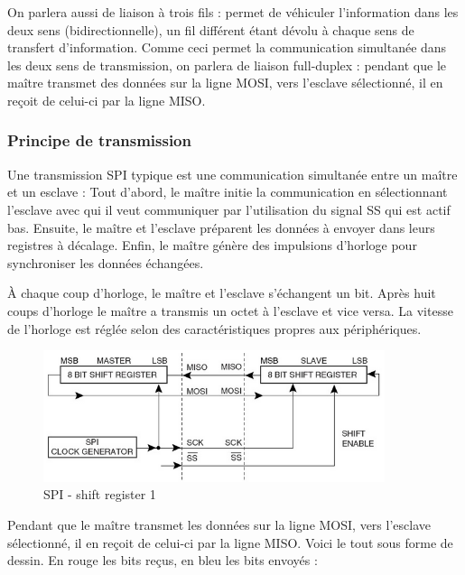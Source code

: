 \documentclass[french,a4paper,12pt]{report}
\begin{document}
	On parlera aussi de liaison à trois fils : permet de véhiculer l’information dans les deux sens (bidirectionnelle), un fil différent étant dévolu à chaque sens de transfert d’information. Comme ceci permet la communication simultanée dans les deux sens de transmission, on parlera de liaison full-duplex : pendant que le maître transmet des données sur la ligne MOSI, vers l’esclave sélectionné, il en reçoit de celui-ci par la ligne MISO.

  		\subsubsection{Principe de transmission}
  		
			Une transmission SPI typique est une communication simultanée entre un maître et un esclave :
Tout d'abord, le maître initie la communication en sélectionnant l'esclave avec qui il veut communiquer par l'utilisation du signal SS qui est actif bas.
Ensuite, le maître et l'esclave préparent les données à envoyer dans leurs registres à décalage.
Enfin, le maître génère des impulsions d'horloge pour synchroniser les données échangées.
 
À chaque coup d'horloge, le maître et l'esclave s'échangent un bit. Après huit coups d'horloge le maître a transmis un octet à l'esclave et vice versa. La vitesse de l'horloge est réglée selon des caractéristiques propres aux périphériques.

	\begin{figure}[!ht]
    \center
  	\includegraphics[width=10cm]{SPI3.png}
    \caption{SPI - shift register 1}
	\end{figure}
 
Pendant que le maître transmet les données sur la ligne MOSI, vers l’esclave sélectionné, il en reçoit de celui-ci par la ligne MISO.
Voici le tout sous forme de dessin. En rouge les bits reçus, en bleu les bits envoyés :
\end{document}

